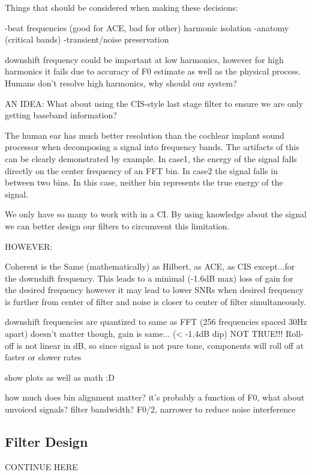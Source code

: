 \documentclass [11pt, proquest] {uwthesis}[2015/03/03]
\begin{document}
Things that should be considered when making these decisions:

-beat frequencies (good for ACE, bad for other)
	harmonic isolation
-anatomy (critical bands)
-transient/noise preservation

downshift frequency could be important at low harmonics, however for high harmonics it fails due to accuracy of F0 estimate as well as the physical process.  Humans don't resolve high harmonics, why should our system?


AN IDEA:
What about using the CIS-style last stage filter to ensure we are only getting baseband information?




The human ear has much better resolution than the cochlear implant sound processor when decomposing a signal into frequency bands.  The artifacts of this can be clearly demonstrated by example.  In case1, the energy of the signal falls directly on the center frequency of an FFT bin.  In case2 the signal falls in between two bins.  In this case, neither bin represents the true energy of the signal.

We only have so many to work with in a CI.  By using knowledge about the signal we can better design our filters to circumvent this limitation.

HOWEVER:

Coherent is the Same (mathematically) as Hilbert, as ACE, as CIS except...for the downshift frequency.  This leads to a minimal (-1.6dB max) loss of gain for the desired frequency however it may lead to lower SNRs when desired frequency is further from center of filter and noise is closer to center of filter simultaneously.

downshift frequencies are quantized to same as FFT (256 frequencies spaced 30Hz apart)
doesn't matter though, gain is same... (< -1.4dB dip)
NOT TRUE!!! Roll-off is not linear in dB, so since signal is not pure tone, components will roll off at faster or slower rates

show plots as well as math :D

how much does bin alignment matter?  it's probably a function of F0, what about unvoiced signals?
filter bandwidth? F0/2, narrower to reduce noise interference


\subsection{Filter Design}

CONTINUE HERE
\end{document}
